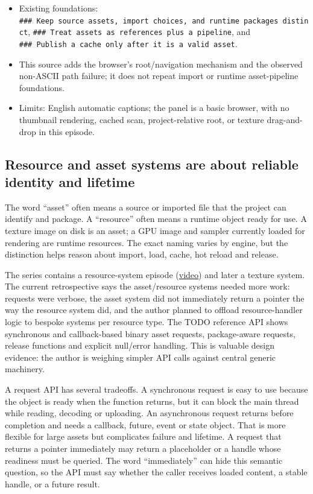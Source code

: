 \begin{itemize}
\tightlist
\item
  Existing foundations: \texttt{\#\#\#\ Keep\ source\ assets,\ import\ choices,\ and\ runtime\ packages\ distinct}, \texttt{\#\#\#\ Treat\ assets\ as\ references\ plus\ a\ pipeline}, and \texttt{\#\#\#\ Publish\ a\ cache\ only\ after\ it\ is\ a\ valid\ asset}.
\item
  This source adds the browser's root/navigation mechanism and the observed non-ASCII path failure; it does not repeat import or runtime asset-pipeline foundations.
\item
  Limits: English automatic captions; the panel is a basic browser, with no thumbnail rendering, cached scan, project-relative root, or texture drag-and-drop in this episode.
\end{itemize}

\subsection{Resource and asset systems are about reliable identity and lifetime}\label{06-engine-ii-ch027-resource-and-asset-systems-are-about-reliable-identity-and-lifetime}

The word ``asset'' often means a source or imported file that the project can identify and package. A ``resource'' often means a runtime object ready for use. A texture image on disk is an asset; a GPU image and sampler currently loaded for rendering are runtime resources. The exact naming varies by engine, but the distinction helps reason about import, load, cache, hot reload and release.

The series contains a resource-system episode (\href{https://www.youtube.com/watch?v=ubin1HH_kqw}{video}) and later a texture system. The current retrospective says the asset/resource systems needed more work: requests were verbose, the asset system did not immediately return a pointer the way the resource system did, and the author planned to offload resource-handler logic to bespoke systems per resource type. The TODO reference API shows synchronous and callback-based binary asset requests, package-aware requests, release functions and explicit null/error handling. This is valuable design evidence: the author is weighing simpler API calls against central generic machinery.

A request API has several tradeoffs. A synchronous request is easy to use because the object is ready when the function returns, but it can block the main thread while reading, decoding or uploading. An asynchronous request returns before completion and needs a callback, future, event or state object. That is more flexible for large assets but complicates failure and lifetime. A request that returns a pointer immediately may return a placeholder or a handle whose readiness must be queried. The word ``immediately'' can hide this semantic question, so the API must say whether the caller receives loaded content, a stable handle, or a future result.

